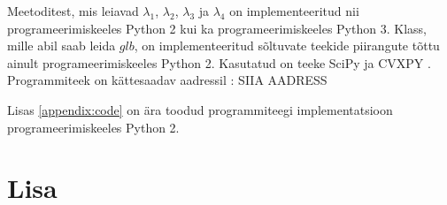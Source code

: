 \documentclass[a4paper,12pt,oneside]{article}
\numberwithin{equation}{section}
\theoremstyle{definition}
\begin{document}
Meetoditest, mis leiavad $\lambda_1$, $\lambda_2$, $\lambda_3$ ja $\lambda_4$ on implementeeritud nii programeerimiskeeles Python 2 kui ka programeerimiskeeles Python 3. Klass, mille abil saab leida $glb$, on implementeeritud sõltuvate teekide piirangute tõttu ainult programeerimiskeeles Python 2.  Kasutatud on teeke SciPy \cite{JonesE.;OliphantT;Peterson} ja CVXPY \cite{DiamondS;ChuE;Boyd2014}.
Programmiteek on kättesaadav aadressil : {\color{red} SIIA AADRESS}

Lisas \ref{appendix:code} on ära toodud programmiteegi implementatsioon programeerimiskeeles Python 2.










\pagebreak
{}


\pagebreak

\section*{Lisa}
\end{document}
